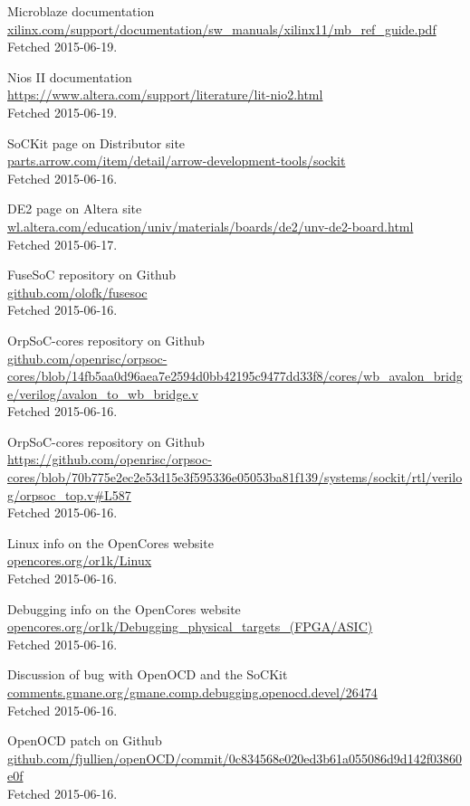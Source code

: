 \documentclass[11pt,a4paper,twoside,openany]{report}
\begin{document}
\begin{thebibliography}{99}
	Microblaze documentation\\
	\url{xilinx.com/support/documentation/sw_manuals/xilinx11/mb_ref_guide.pdf}\\
	Fetched 2015-06-19.

	Nios II documentation\\
	\url{https://www.altera.com/support/literature/lit-nio2.html}\\
	Fetched 2015-06-19.

  SoCKit page on Distributor site\\
  \url{parts.arrow.com/item/detail/arrow-development-tools/sockit}\\
  Fetched 2015-06-16.

	DE2 page on Altera site\\
  \url{wl.altera.com/education/univ/materials/boards/de2/unv-de2-board.html}\\
  Fetched 2015-06-17.
  
  FuseSoC repository on Github\\
  \url{github.com/olofk/fusesoc}\\
  Fetched 2015-06-16.
  
	OrpSoC-cores repository on Github\\
	\url{github.com/openrisc/orpsoc-cores/blob/14fb5aa0d96aea7e2594d0bb42195c9477dd33f8/cores/wb_avalon_bridge/verilog/avalon_to_wb_bridge.v} \\
	Fetched 2015-06-16.
	  
	OrpSoC-cores repository on Github\\
	\url{https://github.com/openrisc/orpsoc-cores/blob/70b775e2ec2e53d15e3f595336e05053ba81f139/systems/sockit/rtl/verilog/orpsoc_top.v#L587} \\
	Fetched 2015-06-16.
	
	Linux info on the OpenCores website\\
	\url{opencores.org/or1k/Linux}\\
	Fetched 2015-06-16.
	
	Debugging info on the OpenCores website\\
	\url{opencores.org/or1k/Debugging_physical_targets_(FPGA/ASIC)}\\
	Fetched 2015-06-16.
	
	Discussion of bug with OpenOCD and the SoCKit\\
	\url{comments.gmane.org/gmane.comp.debugging.openocd.devel/26474}\\
	Fetched 2015-06-16.
	
	OpenOCD patch on Github\\
	\url{github.com/fjullien/openOCD/commit/0c834568e020ed3b61a055086d9d142f03860e0f}\\
	Fetched 2015-06-16.
\end{thebibliography}
\end{document}
